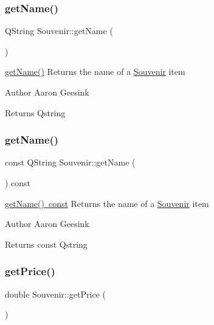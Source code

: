 \subsubsection{\texorpdfstring{getName()}{getName()}\hspace{0.1cm}{\footnotesize\ttfamily [1/2]}}
{\footnotesize\ttfamily Q\+String Souvenir\+::get\+Name (\begin{DoxyParamCaption}{ }\end{DoxyParamCaption})}



\mbox{\hyperlink{class_souvenir_acdfe838ebcf9839c888d872ca6a75782}{get\+Name()}} Returns the name of a \mbox{\hyperlink{class_souvenir}{Souvenir}} item 

\begin{DoxyAuthor}{Author}
Aaron Geesink 
\end{DoxyAuthor}
\begin{DoxyReturn}{Returns}
Qstring 
\end{DoxyReturn}
\mbox{\label{class_souvenir_a9217ac954224c2c44df986cff868b90f}} 
\subsubsection{\texorpdfstring{getName()}{getName()}\hspace{0.1cm}{\footnotesize\ttfamily [2/2]}}
{\footnotesize\ttfamily const Q\+String Souvenir\+::get\+Name (\begin{DoxyParamCaption}{ }\end{DoxyParamCaption}) const}



\mbox{\hyperlink{class_souvenir_a9217ac954224c2c44df986cff868b90f}{get\+Name() const}} Returns the name of a \mbox{\hyperlink{class_souvenir}{Souvenir}} item 

\begin{DoxyAuthor}{Author}
Aaron Geesink 
\end{DoxyAuthor}
\begin{DoxyReturn}{Returns}
const Qstring 
\end{DoxyReturn}
\mbox{\label{class_souvenir_a1cb4a0a435a8343fb4a6519e534e6a69}} 
\subsubsection{\texorpdfstring{getPrice()}{getPrice()}\hspace{0.1cm}{\footnotesize\ttfamily [1/2]}}
{\footnotesize\ttfamily double Souvenir\+::get\+Price (\begin{DoxyParamCaption}{ }\end{DoxyParamCaption})}



